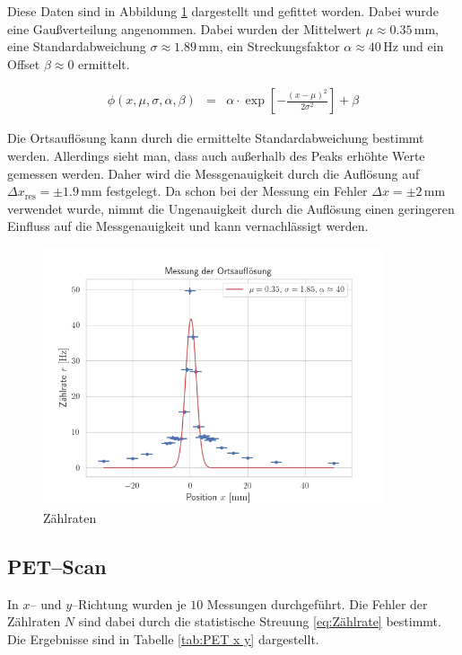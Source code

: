 \documentclass[12pt,a4paper]{scrartcl}
\numberwithin{equation}{section} %
\begin{document}
\noindent
Diese Daten sind in Abbildung \ref{abb:zaehlrate} dargestellt und gefittet worden. Dabei wurde eine Gaußverteilung angenommen. Dabei wurden der Mittelwert $\mu\approx 0.35\,\mathrm{mm}$, eine Standardabweichung $\sigma\approx1.89\,\mathrm{mm}$, ein Streckungsfaktor $\alpha\approx 40\,\mathrm{Hz}$ und ein Offset $\beta\approx 0$ ermittelt.

\begin{eqnarray}
    \phi(x, \mu, \sigma, \alpha, \beta) &=& \alpha\cdot \exp\left[- \frac{(x - \mu)^2}{2\sigma^2} \right] + \beta \label{eq:gauss-fit}
\end{eqnarray}

\noindent
Die Ortsauflösung kann durch die ermittelte Standardabweichung bestimmt werden. Allerdings sieht man, dass auch außerhalb des Peaks erhöhte Werte gemessen werden. Daher wird die Messgenauigkeit durch die Auflösung auf $\Delta x_\mathrm{res}=\pm 1.9\,\mathrm{mm}$ festgelegt. Da schon bei der Messung ein Fehler $\Delta x=\pm 2\,\mathrm{mm}$ verwendet wurde, nimmt die Ungenauigkeit durch die Auflösung einen geringeren Einfluss auf die Messgenauigkeit und kann vernachlässigt werden.

\begin{figure}[h]
	\centering
	\includegraphics[width=0.9\textwidth]{../media/B3.4/Ortsaufloesung_fit.png}
	\caption{Zählraten}
	\label{abb:zaehlrate}
\end{figure}

\clearpage
\hypertarget{petscan}{%
\subsection{PET--Scan}\label{petscan}}
In $x$-- und $y$--Richtung wurden je $10$ Messungen durchgeführt. Die Fehler der Zählraten $N$ sind dabei durch die statistische Streuung \eqref{eq:Zählrate} bestimmt. Die Ergebnisse sind in Tabelle \ref{tab:PET x y} dargestellt.
\end{document}
